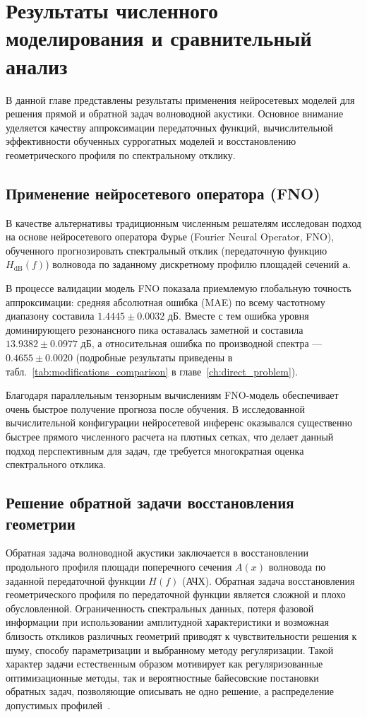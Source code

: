 \chapter{Результаты численного моделирования и сравнительный анализ}
\label{ch:results}

В данной главе представлены результаты применения нейросетевых моделей для решения прямой и обратной задач волноводной акустики. Основное внимание уделяется качеству аппроксимации передаточных функций, вычислительной эффективности обученных суррогатных моделей и восстановлению геометрического профиля по спектральному отклику.

\section{Применение нейросетевого оператора (FNO)}
\label{sec:fno}

В качестве альтернативы традиционным численным решателям исследован подход на основе нейросетевого оператора Фурье (Fourier Neural Operator, FNO), обученного прогнозировать спектральный отклик (передаточную функцию $H_{\mathrm{dB}}(f)$) волновода по заданному дискретному профилю площадей сечений $\mathbf{a}$. 

В процессе валидации модель FNO показала приемлемую глобальную точность аппроксимации: средняя абсолютная ошибка (MAE) по всему частотному диапазону составила $1.4445 \pm 0.0032$ дБ. Вместе с тем ошибка уровня доминирующего резонансного пика оставалась заметной и составила $13.9382 \pm 0.0977$ дБ, а относительная ошибка по производной спектра --- $0.4655 \pm 0.0020$ (подробные результаты приведены в табл.~\ref{tab:modifications_comparison} в главе~\ref{ch:direct_problem}). 

Благодаря параллельным тензорным вычислениям FNO-модель обеспечивает очень быстрое получение прогноза после обучения. В исследованной вычислительной конфигурации нейросетевой инференс оказывался существенно быстрее прямого численного расчета на плотных сетках, что делает данный подход перспективным для задач, где требуется многократная оценка спектрального отклика.

\section{Решение обратной задачи восстановления геометрии}
\label{sec:inverse_problem}

Обратная задача волноводной акустики заключается в восстановлении продольного профиля площади поперечного сечения $A(x)$ волновода по заданной передаточной функции $H(f)$ (АЧХ). Обратная задача восстановления геометрического профиля по передаточной функции является сложной и плохо обусловленной. Ограниченность спектральных данных, потеря фазовой информации при использовании амплитудной характеристики и возможная близость откликов различных геометрий приводят к чувствительности решения к шуму, способу параметризации и выбранному методу регуляризации. Такой характер задачи естественным образом мотивирует как регуляризованные оптимизационные методы, так и вероятностные байесовские постановки обратных задач, позволяющие описывать не одно решение, а распределение допустимых профилей~\cite{colton2013,stuart2010}.

